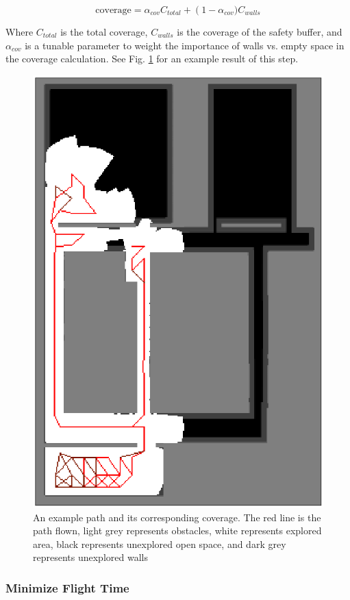 \documentclass[letterpaper, 10 pt, conference]{ieeeconf}  %
\begin{document}
\begin{equation}%
    \text{coverage} = \alpha_{cov} C_{total} + \left(1-\alpha_{cov})\right. C_{walls}
\end{equation}

Where $C_{total}$ is the total coverage, $C_{walls}$ is the coverage of the safety buffer, and $\alpha_{cov}$ is a tunable parameter to weight the importance of walls vs. empty space in the coverage calculation. See Fig. \ref{fig:coverage} for an example result of this step.

\begin{figure}
\centering
\includegraphics[width=0.8\linewidth]{figures/coverage_map3.png}
\caption{An example path and its corresponding coverage. The red line is the path flown, light grey represents obstacles, white represents explored area, black represents unexplored open space, and dark grey represents unexplored walls}
\label{fig:coverage}
\end{figure}

\subsubsection{Minimize Flight Time}
\end{document}
